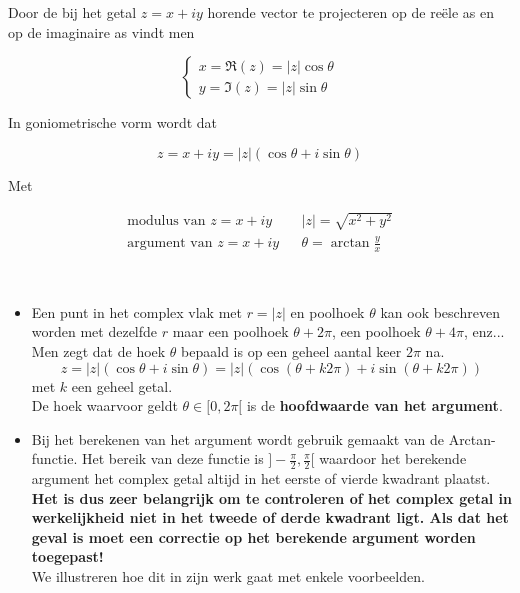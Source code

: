 Door de bij het getal $z=x+iy$ horende vector te projecteren op de re\"{e}le as en op de imaginaire as vindt men

\[ \left\{ \begin{array}{l}
x=\Re(z)=|z|\cos \theta  \\ y=\Im(z)=|z|\sin \theta
\end{array} \right. \]

\begin{eigenschap}
	In goniometrische vorm wordt dat

\begin{framed}
\[ z=x+iy=|z|(\cos \theta + i \sin \theta)   \]
\end{framed}
Met 

\begin{framed}
	\[ \begin{array}{lll}
	\text{modulus van } z=x+iy & & |z|=\sqrt{x^2 +y^2} \\
	\text{argument van } z=x+iy & & \theta = \arctan \frac{y}{x}
	\end{array} \]
\end{framed}

\end{eigenschap}


\begin{opmerking}
\ \\
\begin{itemize}
	\item Een punt in het complex vlak met $r=|z|$ en poolhoek $\theta$ kan ook beschreven worden met dezelfde $r$ maar een poolhoek $\theta+2\pi$, een poolhoek $\theta+ 4\pi$, enz... Men zegt dat de hoek $\theta$ bepaald is op een geheel aantal keer $2\pi$ na.
	\[ z=|z|(\cos \theta + i \sin \theta)=|z|(\cos(\theta +k2\pi)+i \sin(\theta+k2\pi)) \]
	met $k$ een geheel getal.\\
	De hoek waarvoor geldt $\theta \in [0,2\pi[$ is de {\bf hoofdwaarde van het argument}. 
	\item Bij het berekenen van het argument wordt gebruik gemaakt van de Arctan-functie. Het bereik van deze functie is $]-\frac{\pi}{2},\frac{\pi}{2}[$ waardoor het berekende argument het complex getal altijd in het eerste of vierde kwadrant plaatst.\\ 
	{\bf Het is dus zeer belangrijk om te controleren of het complex getal in werkelijkheid niet in het tweede of derde kwadrant ligt. Als dat het geval is moet een correctie op het berekende argument worden toegepast!} \\ We illustreren hoe dit in zijn werk gaat met enkele voorbeelden.
\end{itemize}

\end{opmerking}

